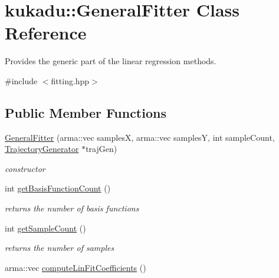 \hypertarget{classkukadu_1_1GeneralFitter}{}\section{kukadu\+:\+:General\+Fitter Class Reference}
\label{classkukadu_1_1GeneralFitter}


Provides the generic part of the linear regression methods.  




{\ttfamily \#include $<$fitting.\+hpp$>$}

\subsection*{Public Member Functions}
\begin{DoxyCompactItemize}
\item 
\hyperlink{classkukadu_1_1GeneralFitter_a6546135463b8ae78e707a5538166d545}{General\+Fitter} (arma\+::vec samplesX, arma\+::vec samplesY, int sample\+Count, \hyperlink{classkukadu_1_1TrajectoryGenerator}{Trajectory\+Generator} $\ast$traj\+Gen)
\begin{DoxyCompactList}\small\item\em constructor \end{DoxyCompactList}\item 
int \hyperlink{classkukadu_1_1GeneralFitter_ac87a8f6d6e036c424dd022808876421f}{get\+Basis\+Function\+Count} ()\hypertarget{classkukadu_1_1GeneralFitter_ac87a8f6d6e036c424dd022808876421f}{}\label{classkukadu_1_1GeneralFitter_ac87a8f6d6e036c424dd022808876421f}

\begin{DoxyCompactList}\small\item\em returns the number of basis functions \end{DoxyCompactList}\item 
int \hyperlink{classkukadu_1_1GeneralFitter_ab5aad99091bf484941090ce2dcaf9881}{get\+Sample\+Count} ()\hypertarget{classkukadu_1_1GeneralFitter_ab5aad99091bf484941090ce2dcaf9881}{}\label{classkukadu_1_1GeneralFitter_ab5aad99091bf484941090ce2dcaf9881}

\begin{DoxyCompactList}\small\item\em returns the number of samples \end{DoxyCompactList}\item 
arma\+::vec \hyperlink{classkukadu_1_1GeneralFitter_ad83ff2da0b13813710684596ee4e28df}{compute\+Lin\+Fit\+Coefficients} ()\hypertarget{classkukadu_1_1GeneralFitter_ad83ff2da0b13813710684596ee4e28df}{}\label{classkukadu_1_1GeneralFitter_ad83ff2da0b13813710684596ee4e28df}


\end{DoxyCompactItemize}
